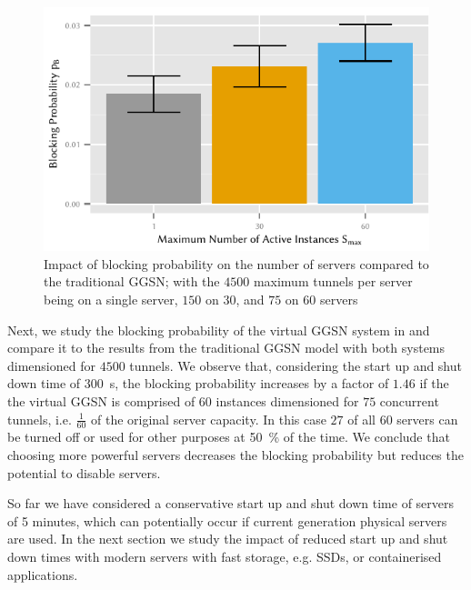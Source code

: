 \begin{figure}
  \centering
  \includegraphics{cloud/virtualized_network_functions/performance_evaluation/figures/blocking_comparison}
  \caption{Impact of blocking probability on the number of servers compared to the traditional \gls{GGSN}; with the \(4500\) maximum tunnels per server being on a single server, \(150\) on \(30\), and \(75\) on \(60\) servers}
  \label{fig:cloud:virtualized_network_functions:performance_evaluation:virtual_ggsn:blocking_comparison}
\end{figure}

Next, we study the blocking probability of the virtual \gls{GGSN} system in  and compare it to the results from the traditional \gls{GGSN} model with both systems dimensioned for \(4500\) tunnels.
We observe that, considering the start up and shut down time of \SI{300}{\second}, the blocking probability increases by a factor of \(1.46\) if the the virtual \gls{GGSN} is comprised of \(60\) instances dimensioned for \(75\) concurrent tunnels, i.e. \(\frac{1}{60}\) of the original server capacity.
In this case \(27\) of all \(60\) servers can be turned off or used for other purposes at \SI{50}{\percent} of the time.
We conclude that choosing more powerful servers decreases the blocking probability but reduces the potential to disable servers.

So far we have considered a conservative start up and shut down time of servers of 5 minutes, which can potentially occur if current generation physical servers are used.
In the next section we study the impact of reduced start up and shut down times with modern servers with fast storage, e.g. \glspl{SSD}, or containerised applications.

